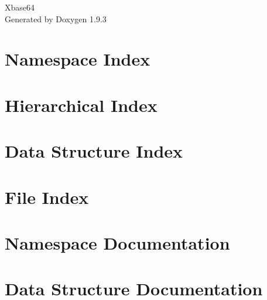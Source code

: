 \documentclass[twoside]{book}
\newcommand{\+}{\discretionary{\mbox{\scriptsize$\hookleftarrow$}}{}{}}
\newcommand{\clearemptydoublepage}{%
    \newpage{\pagestyle{empty}\cleardoublepage}%
  }
\begin{document}
  \raggedbottom
    \hypersetup{pageanchor=false,
                bookmarksnumbered=true,
                pdfencoding=unicode
               }
  \begin{titlepage}
  \vspace*{7cm}
  \begin{center}%
  {\Large Xbase64}\\
  \vspace*{1cm}
  {\large Generated by Doxygen 1.9.3}\\
  \end{center}
  \end{titlepage}
  \clearemptydoublepage
  \tableofcontents
  \clearemptydoublepage
  \hypersetup{pageanchor=true}
\chapter{Namespace Index}

\chapter{Hierarchical Index}

\chapter{Data Structure Index}

\chapter{File Index}

\chapter{Namespace Documentation}

\chapter{Data Structure Documentation}












\end{document}
